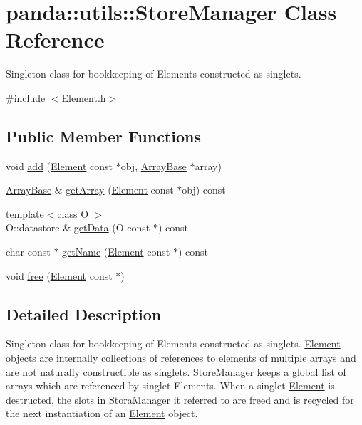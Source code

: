 \hypertarget{classpanda_1_1utils_1_1StoreManager}{
\section{panda::utils::StoreManager Class Reference}
\label{classpanda_1_1utils_1_1StoreManager}
}


Singleton class for bookkeeping of Elements constructed as singlets.  


{\ttfamily \#include $<$Element.h$>$}\subsection*{Public Member Functions}
\begin{DoxyCompactItemize}
\item 
void \hyperlink{classpanda_1_1utils_1_1StoreManager_a00231bb2c891092ad0f9d5a1a0bd6ca7}{add} (\hyperlink{classpanda_1_1Element}{Element} const $\ast$obj, \hyperlink{classpanda_1_1ArrayBase}{ArrayBase} $\ast$array)
\item 
\hyperlink{classpanda_1_1ArrayBase}{ArrayBase} \& \hyperlink{classpanda_1_1utils_1_1StoreManager_abe68d6fb7a29bcb532f6cf32821df95b}{getArray} (\hyperlink{classpanda_1_1Element}{Element} const $\ast$obj) const 
\item 
{\footnotesize template$<$class O $>$ }\\O::datastore \& \hyperlink{classpanda_1_1utils_1_1StoreManager_a6a926a8958407d4c8c14e2fee165f637}{getData} (O const $\ast$) const 
\item 
char const $\ast$ \hyperlink{classpanda_1_1utils_1_1StoreManager_acada8d02da4ba8c252b1a0f4c78346aa}{getName} (\hyperlink{classpanda_1_1Element}{Element} const $\ast$) const 
\item 
void \hyperlink{classpanda_1_1utils_1_1StoreManager_aa15753a379877e64b2d967886aca2021}{free} (\hyperlink{classpanda_1_1Element}{Element} const $\ast$)
\end{DoxyCompactItemize}


\subsection{Detailed Description}
Singleton class for bookkeeping of Elements constructed as singlets. \hyperlink{classpanda_1_1Element}{Element} objects are internally collections of references to elements of multiple arrays and are not naturally constructible as singlets. \hyperlink{classpanda_1_1utils_1_1StoreManager}{StoreManager} keeps a global list of arrays which are referenced by singlet Elements. When a singlet \hyperlink{classpanda_1_1Element}{Element} is destructed, the slots in StoraManager it referred to are freed and is recycled for the next instantiation of an \hyperlink{classpanda_1_1Element}{Element} object. 

